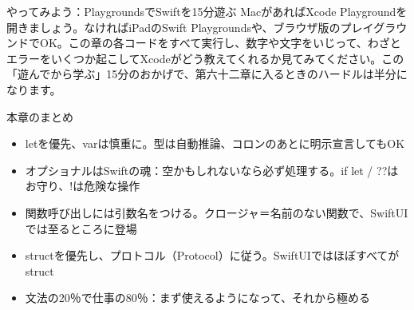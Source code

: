 \begin{tcbpractice}{やってみよう：PlaygroundsでSwiftを15分遊ぶ}
MacがあればXcode Playgroundを開きましょう。なければiPadのSwift Playgroundsや、ブラウザ版のプレイグラウンドでOK。この章の各コードをすべて実行し、数字や文字をいじって、わざとエラーをいくつか起こしてXcodeがどう教えてくれるか見てみてください。この「遊んでから学ぶ」15分のおかげで、第六十二章に入るときのハードルは半分になります。

\end{tcbpractice}

\begin{tcbsummary}{本章のまとめ}
\begin{itemize}
  \item letを優先、varは慎重に。型は自動推論、コロンのあとに明示宣言してもOK
  \item オプショナルはSwiftの魂：空かもしれないなら必ず処理する。if let / ??はお守り、!は危険な操作
  \item 関数呼び出しには引数名をつける。クロージャ＝名前のない関数で、SwiftUIでは至るところに登場
  \item structを優先し、プロトコル（Protocol）に従う。SwiftUIではほぼすべてがstruct
  \item 文法の20％で仕事の80％：まず使えるようになって、それから極める
\end{itemize}

\end{tcbsummary}
